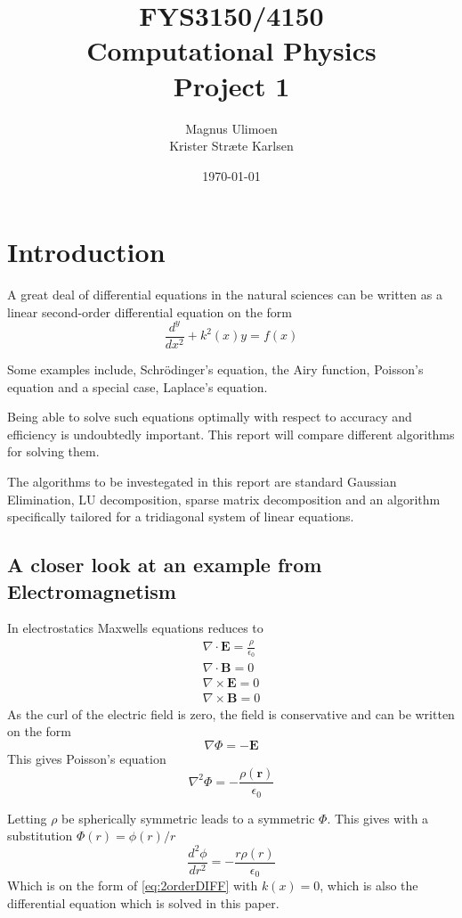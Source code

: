 \documentclass[11pt,a4paper,english]{article}
\title{FYS3150/4150\\Computational Physics\\Project 1}
\author{Magnus Ulimoen\\Krister Stræte Karlsen}
\date{\today}
\numberwithin{equation}{section}
\newcommand{\ve}[1]{\mathbf{#1}} %
\begin{document}
\maketitle

\section{Introduction}

A great deal of differential equations in the natural sciences can be written 
as a linear second-order differential equation on the form
\begin{equation}
\frac{d^y}{dx^2} + k^2(x)y = f(x)
\label{eq:2orderDIFF}
\end{equation}

Some examples include, Schrödinger's equation, the Airy function,
Poisson's equation and a special case, Laplace's equation.

Being able to solve such equations optimally with respect to accuracy 
and efficiency is undoubtedly important. This report will compare 
different algorithms for solving them.

The algorithms to be investegated in this report are	 standard Gaussian 
Elimination, LU decomposition, sparse matrix decomposition and an 
algorithm specifically tailored for a tridiagonal system of 
linear equations. 


\subsection{A closer look at an example from Electromagnetism}

In electrostatics Maxwells equations reduces to
\begin{gather}
\nabla \cdot \ve{E} = \frac{\rho}{\epsilon_0}\\
\nabla \cdot \ve{B} = 0\\
\nabla \times \ve{E} = 0\\
\nabla \times \ve{B} = 0
\end{gather}
As the curl of the electric field is zero, the field is conservative
and can be written on the form
\begin{equation}
\nabla \Phi = -\ve{E}
\end{equation}
This gives Poisson's equation
\begin{equation}
\nabla^2\Phi = -\frac{\rho(\ve{r})}{\epsilon_0}
\end{equation}

Letting $\rho$ be spherically symmetric leads to a symmetric $\Phi$.
This gives with a substitution $\Phi(r) = \phi(r)/r$
\begin{equation}
\frac{d^2\phi}{dr^2} = -\frac{r\rho(r)}{\epsilon_0}
\end{equation}
Which is on the form of \eqref{eq:2orderDIFF} with $k(x)=0$, which is also the differential
equation which is solved in this paper.
\end{document}
